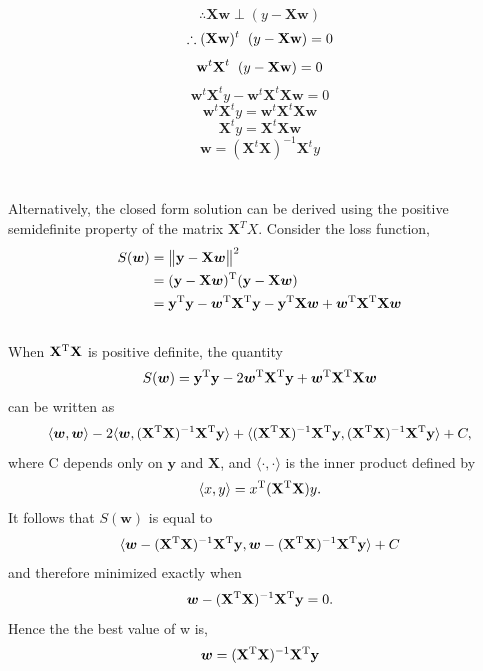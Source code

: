 \documentclass[17pt]{article}
\begin{document}
$$\therefore \textbf{Xw} \perp (y-\textbf{Xw}) $$
$$\therefore (\textbf{Xw})^{t} \hspace{0.2cm}  (y-\textbf{Xw})=0$$
$$\textbf{w}^{t}\textbf{X}^{t} \hspace{0.2cm} (y-\textbf{Xw})=0 $$
$$\textbf{w}^{t}\textbf{X}^{t}y-\textbf{w}^{t}\textbf{X}^{t}\textbf{Xw}=0$$
$$\textbf{w}^{t}\textbf{X}^{t}y=\textbf{w}^{t}\textbf{X}^{t}\textbf{Xw}$$
$$\textbf{X}^{t}y=\textbf{X}^{t}\textbf{Xw}$$
$$\textbf{w}=(\textbf{X}^{t}\textbf{X})^{-1}\textbf{X}^{t}y$$
\\
\\
Alternatively, the closed form solution can be derived using the positive semidefinite property of the matrix $\boldsymbol X^TX$. Consider the loss function,
\begin{equation*}
\begin{aligned}
S({\boldsymbol {w }}) 
	&={\bigl \|}\mathbf {y} -\mathbf {X} {\boldsymbol {w }}{\bigr \|}^{2}\\
	&=(\mathbf {y} -\mathbf {X} {\boldsymbol {w }})^{\rm {T}}(\mathbf {y} -\mathbf {X} {\boldsymbol {w }})\\
	&=\mathbf {y} ^{\rm {T}}\mathbf {y} -{\boldsymbol {w }}^{\rm {T}}\mathbf {X} ^{\rm {T}}\mathbf {y} -\mathbf {y} ^{\rm {T}}\mathbf {X} {\boldsymbol {w }}+{\boldsymbol {w }}^{\rm {T}}\mathbf {X} ^{\rm {T}}\mathbf {X} {\boldsymbol {w }}
\end{aligned}
\end{equation*}\\
When $\mathbf X^{\rm T} \mathbf X$ is positive definite, the quantity
$$S(\boldsymbol{w}) = \mathbf y ^{\rm T} \mathbf y - 2\boldsymbol w ^{\rm T} \mathbf X ^{\rm T} \mathbf y + \boldsymbol w ^{\rm T} \mathbf X ^{\rm T} \mathbf X \boldsymbol w $$
can be written as
$$ \langle \boldsymbol w, \boldsymbol w \rangle - 2\langle \boldsymbol w, (\mathbf X^{\rm T} \mathbf X)^{-1}\mathbf X ^{\rm T} \mathbf y \rangle + \langle(\mathbf X^{\rm T} \mathbf X)^{-1}\mathbf X ^{\rm T} \mathbf y,(\mathbf X^{\rm T} \mathbf X)^{-1}\mathbf X ^{\rm T} \mathbf y \rangle+ C, $$
where  C  depends only on  $\mathbf y $ and  $\mathbf X $, and  $\langle \cdot, \cdot \rangle$  is the inner product defined by
 $$\langle x, y \rangle = x ^{\rm T} (\mathbf X^{\rm T} \mathbf X) y. $$
It follows that $ S(\boldsymbol{w})$  is equal to
$$\langle \boldsymbol w - (\mathbf X^{\rm T} \mathbf X)^{-1}\mathbf X ^{\rm T} \mathbf y,\boldsymbol w - (\mathbf X^{\rm T} \mathbf X)^{-1}\mathbf X ^{\rm T} \mathbf y \rangle+ C $$
and therefore minimized exactly when
$$\boldsymbol w - (\mathbf X^{\rm T} \mathbf X)^{-1}\mathbf X ^{\rm T} \mathbf y = 0.$$
Hence the the best value of w is,
$$\boldsymbol w = (\mathbf X^{\rm T} \mathbf X)^{-1}\mathbf X ^{\rm T} \mathbf y$$
\newpage
\end{document}
